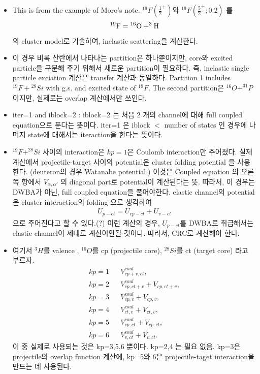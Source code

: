 \documentclass[11pt]{book}
\newcommand{\bea}{\begin{eqnarray}}
\newcommand{\eea}{\end{eqnarray}}
\newcommand{\no}{\nonumber \\}
\begin{document}
\begin{itemize}
\item This is from the example of Moro's note. 
     ${}^{19}F(\frac{1}{2}^+)$와 ${}^{19}F(\frac{5}{2}^+;0.2)$ 를 
     $${}^{19}{\rm F}={}^{16}{\rm O}+^{3}{\rm H}$$
     의 cluster model로 기술하여, inelastic scattering을 계산한다.    
\item  이 경우 비록 산란에서 나타나는 partition은 하나뿐이지만,
core와 excited particle을 구분해 주기 위해서 
새로운 partition이 필요하다. 즉, inelastic single particle exciation 계산은
transfer 계산과 동일하다. Partition 1 includes ${}^{19}F+{}^{28}Si$
with g.s. and excited state of ${}^{19}F$. 
The second partition은 ${}^{16}O+^{31}P$ 이지만, 실제로는 
overlap 계산에서만 쓰인다. 

\item iter=1 and iblock=2 : 
      iblock=2 는 처음 2 개의 channel에 대해 full coupled equation으로 푼다는 뜻이다.
      iter=1 은 iblock $<$ number of states 인 경우에
      나머지 state에 대해서는 iteraction을 한다는 뜻이다.
      
\item ${}^{19}F+^{28}Si$ 사이의 interaction은 $kp=1$은 
      Coulomb interaction만 주어졌다. 실제 계산에서 projectile-target 사이의 
      potential은 {\color{red} cluster folding potential} 을 사용한다. 
      (deuteron의 경우 Watanabe potential.)
      이것은 Coupled equation 의 오른쪽 항에서 $V_{\alpha,\alpha'}$ 의 
      diagonal part로 potential이 계산된다는 뜻. 따라서, 이 경우는 DWBA가 아닌,
      full coupled equation을 풀어야한다. 
      elastic channel의 potential은 
            cluster interaction의 folding 으로 생각하여  
            \bea 
            U_{p-ct}=U_{cp-ct}+U_{v-ct}
            \eea 
            으로 주어진다고 할 수 있다.(?) 이런 계산의 경우, $U_{p-ct}$를 DWBA로 취급해서는 
            elastic channel이 제대로 계산이안될 것이다. 따라서, CRC로 계산해야 한다. 
       
\item 여기서 $^3H$를 valence , ${}^{16}O$를 cp (projectile core), ${}^{28}Si$를 
      ct (target core) 라고 부르자. 
      \bea 
      kp=1 & & V^{coul}_{cp+v,ct} ,\no 
      kp=2 & & V^{coul}_{cp,ct+v}+V_{cp,ct+v},\no 
      kp=3 & & V^{coul}_{cp,v}+V_{cp,v},\no 
      kp=4 & & V^{coul}_{ct,v}+V_{ct,v},\no 
      kp=5 & & V^{coul}_{cp,ct}+V_{cp,ct},\no 
      kp=6 & & V^{coul}_{v,ct}+V_{v,ct}.
      \eea 
      이 중 실제로 사용되는 것은 kp=3,5,6 뿐이다. kp=2,4 는 필요 없음. 
      kp=3은 projectile의 overlap function 계산에,
      kp=5와 6은 projectile-taget interaction을 
      만드는 데 사용된다. 
            

\end{itemize}
\end{document}
